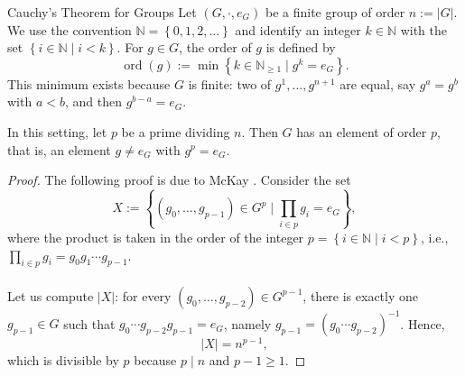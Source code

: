 \begin{appendixitem}{Cauchy's Theorem for Groups}
    Let \( \left(G, \cdot, e_{G}\right) \) be a finite group of order \( n := \left| G \right| \). We use the convention \( \mathbb{N} = \left\{ 0, 1, 2, \dots \right\} \) and identify an integer \( k \in \mathbb{N} \) with the set \( \left\{ i \in \mathbb{N} \mid i < k \right\} \). For \( g \in G \), the order of \( g \) is defined by
    \[
        \operatorname{ord}\left(g\right) := \min\left\{ k \in \mathbb{N}_{\geq 1} \mid g^{k} = e_{G} \right\}.
    \]
    This minimum exists because \( G \) is finite: two of \( g^{1}, \dots, g^{n+1} \) are equal, say \( g^{a} = g^{b} \) with \( a < b \), and then \( g^{b-a} = e_{G} \).
    \begin{theorem}[Cauchy]
        In this setting, let \( p \) be a prime dividing \( n \). Then \( G \) has an element of order \( p \), that is, an element \( g \neq e_{G} \) with \( g^{p} = e_{G} \).
    \end{theorem}
    \begin{proof}
        The following proof is due to McKay \cite{mckay1959cauchy}. Consider the set
        \[
            X := \left\{ \left(g_{0}, \dots, g_{p-1}\right) \in G^{p} \mid \prod_{i \in p} g_{i} = e_{G} \right\},
        \]
        where the product is taken in the order of the integer \( p = \left\{ i \in \mathbb{N} \mid i < p \right\} \), i.e., \( \prod_{i \in p} g_{i} = g_{0} g_{1} \cdots g_{p-1} \).
        \\\\
        Let us compute \( \left| X \right| \): for every \( \left(g_{0}, \dots, g_{p-2}\right) \in G^{p-1} \), there is exactly one \( g_{p-1} \in G \) such that \( g_{0} \cdots g_{p-2} g_{p-1} = e_{G} \), namely \( g_{p-1} = \left(g_{0} \cdots g_{p-2}\right)^{-1} \). Hence,
        \[
            \left| X \right| = n^{p-1},
        \]
        which is divisible by \( p \) because \( p \mid n \) and \( p - 1 \geq 1 \).

\end{proof}
\end{appendixitem}
